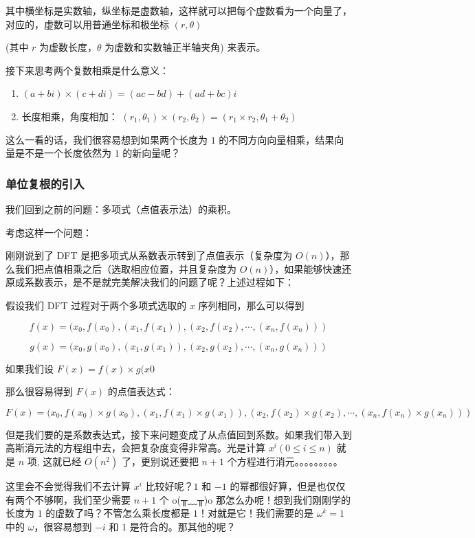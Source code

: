 其中横坐标是实数轴，纵坐标是虚数轴，这样就可以把每个虚数看为一个向量了，对应的，虚数可以用普通坐标和极坐标 $(r,\theta)$

(其中 $r$ 为虚数长度，$\theta$ 为虚数和实数轴正半轴夹角) 来表示。

接下来思考两个复数相乘是什么意义：

\begin{enumerate}
\item $(a+bi) \times (c+di) = (ac-bd) + (ad+bc)i$
\item 长度相乘，角度相加： $(r_1, \theta_1)  \times  (r_2, \theta_2) = (r_1 \times r_2, \theta_1+\theta_2)$
\end{enumerate}

这么一看的话，我们很容易想到如果两个长度为 $1$ 的不同方向向量相乘，结果向量是不是一个长度依然为 $1$ 的新向量呢？

\subsubsection{单位复根的引入}

我们回到之前的问题：多项式（点值表示法）的乘积。

考虑这样一个问题：

刚刚说到了 DFT 是把多项式从系数表示转到了点值表示（复杂度为 $O(n)$），那么我们把点值相乘之后（选取相应位置，并且复杂度为 $O(n)$），如果能够快速还原成系数表示，是不是就完美解决我们的问题了呢？上述过程如下：

假设我们 DFT 过程对于两个多项式选取的 $x$ 序列相同，那么可以得到

$$
f(x)={(x_0, f(x_0), (x_1, f(x_1)), (x_2, f(x_2), \cdots, (x_n, f(x_n)))}
$$

$$
g(x)={(x_0, g(x_0), (x_1, g(x_1)), (x_2, g(x_2), \cdots, (x_n, g(x_n)))}
$$

如果我们设 $F(x) = f(x) \times g(x0$

那么很容易得到 $F(x)$ 的点值表达式：

$$
F(x) = {(x_0, f(x_0)  \times  g(x_0), (x_1, f(x_1)  \times  g(x_1)), (x_2, f(x_2)  \times  g(x_2), \cdots, (x_n, f(x_n)  \times  g(x_n)))}
$$

但是我们要的是系数表达式，接下来问题变成了从点值回到系数。如果我们带入到高斯消元法的方程组中去，会把复杂度变得非常高。光是计算 $x^i(0 \leq i \leq n)$ 就是 $n$ 项, 这就已经 $O(n^2)$ 了，更别说还要把 $n+1$ 个方程进行消元。。。。。。。。。

这里会不会觉得我们不去计算 $x^i$ 比较好呢？$1$ 和 $-1$ 的幂都很好算，但是也仅仅有两个不够啊，我们至少需要 $n+1$ 个 o(╥﹏╥)o 那怎么办呢！想到我们刚刚学的长度为 $1$ 的虚数了吗？不管怎么乘长度都是 $1$！对就是它！我们需要的是 $\omega^k=1$ 中的 $\omega$，很容易想到 $-i$ 和 $1$ 是符合的。那其他的呢？

